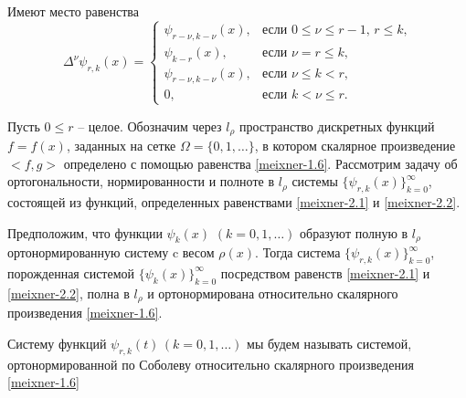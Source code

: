 \begin{lemma}\label{meilem1}
Имеют место равенства
\begin{equation}\label{meixner-2.3}
\Delta^\nu \psi_{r,k}(x)=\begin{cases}\psi_{r-\nu,k-\nu}(x),&\text{если $0\le\nu\le r-1$, $r\le k$,}\\
\psi_{k-r}(x),&\text{если  $\nu=r\le k$,}\\
\psi_{r-\nu,k-\nu}(x),&\text{если $\nu\le k< r$,}\\
0,&\text{если $k< \nu\le r$}.
\end{cases}
\end{equation}
\end{lemma}


Пусть $0\le r$ -- целое. Обозначим через $l_\rho$ пространство дискретных функций $f=f(x)$, заданных на сетке $\Omega=\{0,1,\ldots\}$, в котором скалярное произведение $<f,g>$ определено с помощью равенства \eqref{meixner-1.6}. Рассмотрим  задачу об ортогональности, нормированности и полноте в $l_\rho$ системы $\{\psi_{r,k}(x)\}_{k=0}^\infty$, состоящей из функций, определенных равенствами   \eqref{meixner-2.1} и \eqref{meixner-2.2}.

\begin{theorem}\label{meitheo1}
Предположим, что    функции $\psi_k(x)$ $(k=0,1,\ldots)$ образуют полную в $l_\rho$ ортонормированную систему  c весом   $\rho(x)$. Тогда система $\{\psi_{r,k}(x)\}_{k=0}^\infty$, порожденная системой $\{\psi_{k}(x)\}_{k=0}^\infty$
 посредством равенств \eqref{meixner-2.1} и \eqref{meixner-2.2}, полна  в $l_\rho
 $ и ортонормирована относительно скалярного произведения \eqref{meixner-1.6}.
\end{theorem}

Систему функций $\psi_{r,k}(t)\, (k=0,1,\ldots) $ мы будем называть системой, ортонормированной по Соболеву относительно скалярного произведения \eqref{meixner-1.6}

